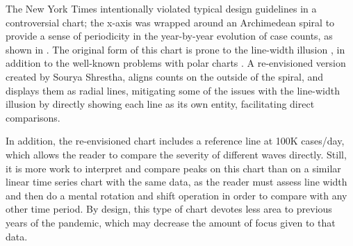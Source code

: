 \documentclass[article]{jdssv}\usepackage[]{graphicx}\usepackage[]{color}
\begin{document}
The New York Times intentionally violated typical design guidelines in a controversial chart; the x-axis was wrapped around an Archimedean spiral to provide a sense of periodicity in the year-by-year evolution of case counts, as shown in . The original form of this chart is prone to the line-width illusion \citep{vanderplasSignsSineIllusion2015}, in addition to the well-known problems with polar charts \citep{hofmannGraphicalTestsPower2012,waldnerComparisonRadialLinear2020}. A re-envisioned version created by Sourya Shrestha, aligns counts on the outside of the spiral, and displays them as radial lines, mitigating some of the issues with the line-width illusion by directly showing each line as its own entity, facilitating direct comparisons. 

In addition, the re-envisioned chart includes a reference line at 100K cases/day, which allows the reader to compare the severity of different waves directly. Still, it is more work to interpret and compare peaks on this chart than on a similar linear time series chart with the same data, as the reader must assess line width and then do a mental rotation and shift operation in order to compare with any other time period. By design, this type of chart devotes less area to previous years of the pandemic, which may decrease the amount of focus given to that data.%
\end{document}
